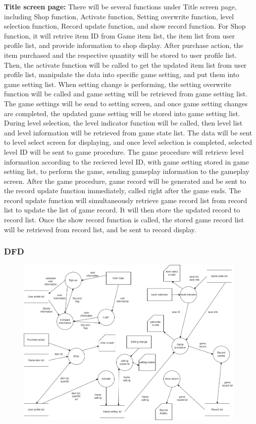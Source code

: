 \documentclass[11pt]{article}
\begin{document}
\textbf{Title screen page:} There will be several functions under Title screen page, including Shop function, Activate function, Setting overwrite function, level selection function, Record update function, and show record function. For Shop function, it will retrive item ID from Game item list, the item list from user profile list, and provide information to shop display. After purchase action, the item purchased and the respective quantity will be stored to user profile list. Then, the activate function will be called to get the updated item list from user profile list, manipulate the data into specific game setting, and put them into game setting list. When setting change is performing, the setting overwrite function will be called and game setting will be retrieved from game setting list. The game settings will be send to setting screen, and once game setting changes are completed, the updated game setting will be stored into game setting list. During level selection, the level indicator function will be called, then level list and level information will be retrieved from game state list. The data will be sent to level select screen for displaying, and once level selection is completed, selected level ID will be sent to game procedure. The game procedure will retrieve level information according to the recieved level ID, with game setting stored in game setting list, to perform the game, sending gameplay information to the gameplay screen. After the game procedure, game record will be generated and be sent to the record update function immediately, called right after the game ends. The record update function will simultaneously retrieve game record list from record list to update the list of game record. It will then store the updated record to record list. Once the show record function is called, the stored game record list will be retrieved from record list, and be sent to record display.
\subsubsection{DFD}
\begin{figure}[H]
    \centering
    \includegraphics*[scale=0.4]{gameflow_DFD.png}
\end{figure}
\end{document}
